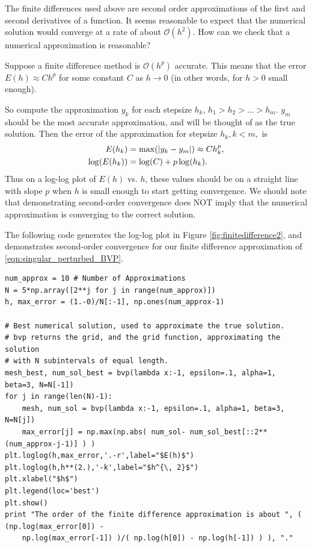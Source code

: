The finite differences used above are second order approximations of the first and second derivatives of a function.  It seems reasonable to expect that the numerical solution would converge at a rate of about $\mathcal{O}(h^2)$. How can we check that a numerical approximation is reasonable?

Suppose a finite difference method is $\mathcal{O}(h^p)$ accurate.
This means that the error $E(h) \approx Ch^p$ for some constant $C$ as $h \to 0$ (in other words, for $h>0$ small enough).
 
So compute the approximation $y_k$ for each stepsize $h_k$, $h_1 > h_2> \ldots>h_m$.
$y_m$ should be the most accurate approximation, and will be thought of as the true solution. 
Then the error of the approximation for 
stepsize $h_k, k < m,$ is 
\begin{align*}
	E(h_k) &= \max( \left\lvert y_k - y_m\right\rvert) \approx C h_k^p ,\\
	\log(E(h_k)) &= \log(C) + p \log(h_k).
\end{align*}
Thus on a log-log plot of $E(h)$ vs. $h$, these values should be on a straight line with slope $p$ when $h$ is small enough to start getting convergence. We should note that demonstrating second-order convergence does NOT imply that the numerical approximation is converging to the correct solution. 

The following code generates the log-log plot in Figure \ref{fig:finitedifference2}, and demonstrates second-order convergence for our finite difference approximation of \eqref{eqn:singular_perturbed_BVP}.
\begin{lstlisting}
num_approx = 10 # Number of Approximations
N = 5*np.array([2**j for j in range(num_approx)])
h, max_error = (1.-0)/N[:-1], np.ones(num_approx-1)

# Best numerical solution, used to approximate the true solution.
# bvp returns the grid, and the grid function, approximating the solution
# with N subintervals of equal length.
mesh_best, num_sol_best = bvp(lambda x:-1, epsilon=.1, alpha=1, beta=3, N=N[-1])
for j in range(len(N)-1): 
    mesh, num_sol = bvp(lambda x:-1, epsilon=.1, alpha=1, beta=3, N=N[j])
    max_error[j] = np.max(np.abs( num_sol- num_sol_best[::2**(num_approx-j-1)] ) )
plt.loglog(h,max_error,'.-r',label="$E(h)$")
plt.loglog(h,h**(2.),'-k',label="$h^{\, 2}$")
plt.xlabel("$h$")
plt.legend(loc='best')
plt.show()
print "The order of the finite difference approximation is about ", ( (np.log(max_error[0]) - 
    np.log(max_error[-1]) )/( np.log(h[0]) - np.log(h[-1]) ) ), "."
\end{lstlisting}







